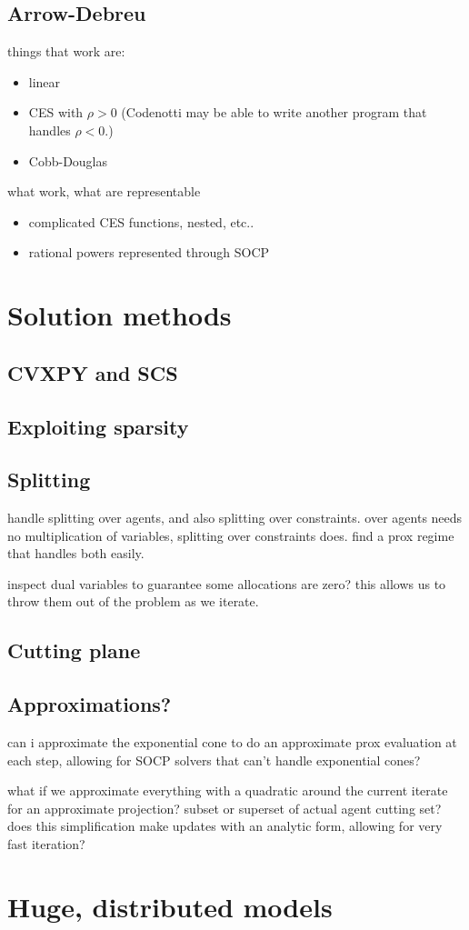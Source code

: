\documentclass{article}
\begin{document}
\subsection{Arrow-Debreu}
things that work are:
\begin{itemize}
\item linear
\item CES with $\rho > 0$ (Codenotti may be able to write another program that handles $\rho < 0$.)
\item Cobb-Douglas
\end{itemize}
what work, what are representable
\begin{itemize}
\item complicated CES functions, nested, etc..
\item rational powers represented through SOCP
\end{itemize}

\section{Solution methods}

\subsection{CVXPY and SCS}
\subsection{Exploiting sparsity}
\subsection{Splitting}
handle splitting over agents, and also splitting over constraints. over agents needs no multiplication of variables, splitting over constraints does. find a prox regime that handles both easily.

inspect dual variables to guarantee some allocations are zero? this allows us to throw them out of the problem as we iterate.

\subsection{Cutting plane}
\subsection{Approximations?}
can i approximate the exponential cone to do an approximate prox evaluation
at each step, allowing for SOCP solvers that can't handle exponential cones?

what if we approximate everything with a quadratic around the current iterate for an approximate projection? subset or superset of actual agent cutting set? does this simplification make updates with an analytic form, allowing for very fast iteration?

\section{Huge, distributed models}

\newpage


\end{document}
